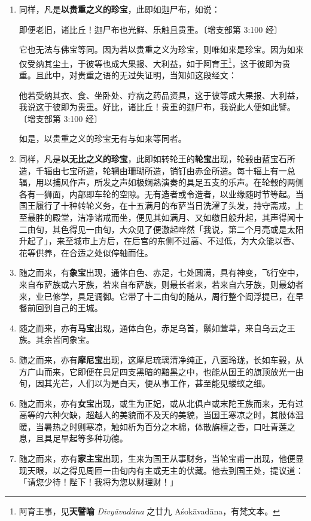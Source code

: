 \begin{enumerate}
\item 同样，凡是\textbf{以贵重之义的珍宝}，此即如迦尸布，如说：\begin{quoting}即便老旧，诸比丘！迦尸布也光鲜、乐触且贵重。{\bluefootnotesize 〔增支部第 3:100 经〕}\end{quoting}它也无法与佛宝等同。因为若以贵重之义为珍宝，则唯如来是珍宝。因为如来仅受纳其尘土，于彼等也成大果报、大利益，如于阿育王\footnote{阿育王事，见\textbf{天譬喻} \textit{Divyāvadāna} 之廿九 Aśokāvadāna，有梵文本。}，这于彼即为贵重。且此中，对贵重之语的无过失证明，当知如这段经文：\begin{quoting}他若受纳其衣、食、坐卧处、疗病之药品资具，这于彼等成大果报、大利益，我说这于彼即为贵重。好比，诸比丘！贵重的迦尸布，我说此人便如此譬。{\bluefootnotesize 〔增支部第 3:100 经〕}\end{quoting}如是，以贵重之义的珍宝无有与如来等同者。
\item 同样，凡是\textbf{以无比之义的珍宝}，此即如转轮王的\textbf{轮宝}出现，轮毂由蓝宝石所造，千辐由七宝所造，轮辋由珊瑚所造，销钉由赤金所造。每十辐上有一总辐，用以捕风作声，所发之声如极娴熟演奏的具足五支的乐声。在轮毂的两侧各有一狮面，内部即车轮的空隙。无有造者或令造者，以业缘随时节等起。当国王履行了十种转轮义务，在十五满月的布萨当日洗濯了头发，持守斋戒，上至最胜的殿堂，洁净诸戒而坐，便见其如满月、又如皦日般升起，其声得闻十二由旬，其色得见一由旬，大众见了便激起哗然「我说，第二个月亮或是太阳升起了」，来至城市上方后，在后宫的东侧不过高、不过低，为大众能以香、花等供养，在合适之处似停轴而住。
\item 随之而来，有\textbf{象宝}出现，通体白色、赤足，七处圆满，具有神变，飞行空中，来自布萨族或六牙族，若来自布萨族，则最长者来，若来自六牙族，则最幼者来，业已修学，具足调御。它带了十二由旬的随从，周行整个阎浮提已，在早餐前回到自己的王城。
\item 随之而来，亦有\textbf{马宝}出现，通体白色，赤足乌首，鬃如萱草，来自乌云之王族。其余皆同象宝。
\item 随之而来，亦有\textbf{摩尼宝}出现，这摩尼琉璃清净纯正，八面玲珑，长如车毂，从方广山而来，它即便在具足四支黑暗的黯黑之中，也能从国王的旗顶放光一由旬，因其光芒，人们以为是白天，便从事工作，甚至能见蝼蚁之细。
\item 随之而来，亦有\textbf{女宝}出现，或生为正妃，或从北俱卢或末陀王族而来，无有过高等的六种欠缺，超越人的美貌而不及天的美貌，当国王寒凉之时，其肢体温暖，当暑热之时则寒凉，触如析为百分之木棉，体散旃檀之香，口吐青莲之息，且具足早起等多种功德。
\item 随之而来，亦有\textbf{家主宝}出现，生来为国王从事财务，当轮宝甫一出现，他便显现天眼，以之得见周匝一由旬内有主或无主的伏藏。他去到国王处，提议道：「请您少待！陛下！我将为您以财理财！」

\end{enumerate}
